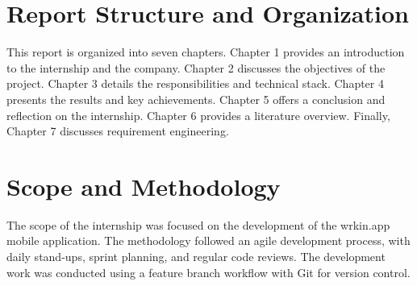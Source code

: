 \section{Report Structure and Organization}
This report is organized into seven chapters. Chapter 1 provides an introduction to the internship and the company. Chapter 2 discusses the objectives of the project. Chapter 3 details the responsibilities and technical stack. Chapter 4 presents the results and key achievements. Chapter 5 offers a conclusion and reflection on the internship. Chapter 6 provides a literature overview. Finally, Chapter 7 discusses requirement engineering.

\section{Scope and Methodology}
The scope of the internship was focused on the development of the wrkin.app mobile application. The methodology followed an agile development process, with daily stand-ups, sprint planning, and regular code reviews. The development work was conducted using a feature branch workflow with Git for version control.
